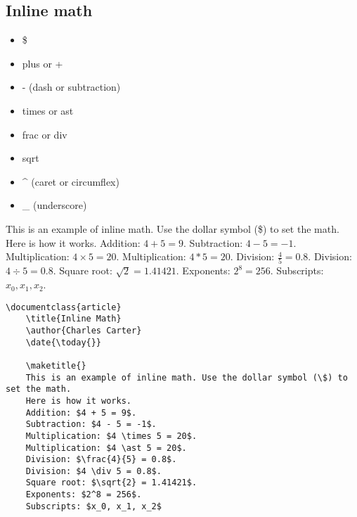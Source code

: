         \subsection{Inline math}
        \label{Inline-math}
        
        \begin{framed}
            \begin{itemize}
                \index{\$}
                \item{\$}
                \item{plus or +}
				\item{- (dash or subtraction)}
                \item{times or ast}
                \item{frac or div}
                \item{sqrt}
				\item{\^{} (caret or circumflex)}
				\item{\_ (underscore)} 
            \end{itemize}
        \end{framed}

	This is an example of inline math. Use the dollar symbol (\$) to set the math. Here is how it works.  Addition: $4 + 5 = 9$.  Subtraction: $4 - 5 = -1$.  Multiplication: $4 \times 5 = 20$.  Multiplication: $4 \ast 5 = 20$.  Division: $\frac{4}{5} = 0.8$.  Division: $4 \div 5 = 0.8$.  Square root: $\sqrt{2} = 1.41421$.  Exponents: $2^8 = 256$.  Subscripts: $x_0, x_1, x_2$.

        \begin{verbatim}
\documentclass{article}
    \title{Inline Math}
    \author{Charles Carter}
    \date{\today{}}
 
    \maketitle{}
	This is an example of inline math. Use the dollar symbol (\$) to set the math. 
	Here is how it works. 
    Addition: $4 + 5 = 9$. 
    Subtraction: $4 - 5 = -1$. 
    Multiplication: $4 \times 5 = 20$. 
    Multiplication: $4 \ast 5 = 20$.
    Division: $\frac{4}{5} = 0.8$. 
    Division: $4 \div 5 = 0.8$. 
    Square root: $\sqrt{2} = 1.41421$. 
    Exponents: $2^8 = 256$.
	Subscripts: $x_0, x_1, x_2$
	    
		\end{verbatim}

